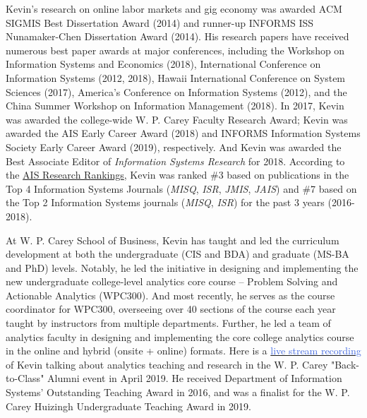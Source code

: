 \documentclass[paper=letter,fontsize=10pt]{scrartcl} %
\begin{document}
Kevin's research on online labor markets and gig economy was awarded ACM SIGMIS Best Dissertation Award (2014) and runner-up INFORMS ISS Nunamaker-Chen Dissertation Award (2014). His research papers have received numerous best paper awards at major conferences, including the Workshop on Information Systems and Economics (2018), International Conference on Information Systems (2012, 2018), Hawaii International Conference on System Sciences (2017), America’s Conference on Information Systems (2012), and the China Summer Workshop on Information Management (2018). In 2017, Kevin was awarded the college-wide W. P. Carey Faculty Research Award; Kevin was awarded the AIS Early Career Award (2018) and INFORMS Information Systems Society Early Career Award (2019), respectively. And Kevin was awarded the Best Associate Editor of \emph{Information Systems Research} for 2018. According to the \href{https://www.aisresearchrankings.org/rankings/}{AIS Research Rankings}, Kevin was ranked \#3 based on publications in the Top 4 Information Systems Journals (\emph{MISQ}, \emph{ISR}, \emph{JMIS}, \emph{JAIS}) and \#7 based on the Top 2 Information Systems journals (\emph{MISQ}, \emph{ISR}) for the past 3 years (2016-2018).
\bigskip

At W. P. Carey School of Business, Kevin has taught and led the curriculum development at both the undergraduate (CIS and BDA) and graduate (MS-BA and PhD) levels. Notably, he led the initiative in designing and implementing the new undergraduate college-level analytics core course -- Problem Solving and Actionable Analytics (WPC300). And most recently, he serves as the course coordinator for WPC300, overseeing over 40 sections of the course each year taught by instructors from multiple departments. Further, he led a team of analytics faculty in designing and implementing the core college analytics course in the online and hybrid (onsite + online) formats. Here is a \href{https://player.theplatform.com/p/U8-EDC/dKzF6F2_w14a/select/media/dCsGzS1z_uCq?form=html}{\textcolor{RoyalBlue}{live stream recording}} of Kevin talking about analytics teaching and research in the W. P. Carey "Back-to-Class" Alumni event in April 2019. He received Department of Information Systems' Outstanding Teaching Award in 2016, and was a finalist for the W. P. Carey Huizingh Undergraduate Teaching Award in 2019.
\bigskip
\end{document}
